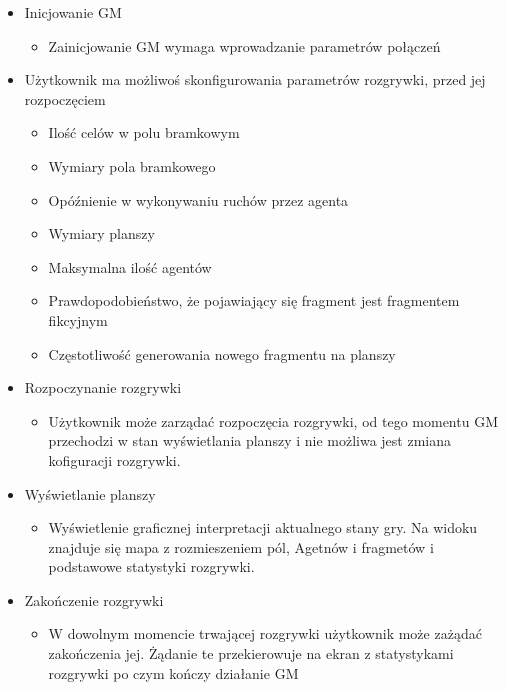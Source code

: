 \documentclass[../Dokumentacja.tex]{subfiles}
\begin{document}
\begin{itemize}
	\item Inicjowanie GM
	\begin{itemize}
		\item Zainicjowanie GM wymaga wprowadzanie parametrów połączeń
	\end{itemize}
	\item Użytkownik ma możliwoś skonfigurowania parametrów rozgrywki, przed jej rozpoczęciem
	\begin{itemize}
		\item Ilość celów w polu bramkowym
		\item Wymiary pola bramkowego
		\item Opóźnienie w wykonywaniu ruchów przez agenta
		\item Wymiary planszy
		\item Maksymalna ilość agentów
		\item Prawdopodobieństwo, że pojawiający się fragment jest fragmentem fikcyjnym
		\item Częstotliwość generowania nowego fragmentu na planszy
	\end{itemize}
	\item Rozpoczynanie rozgrywki
	\begin{itemize}
		\item Użytkownik może zarządać rozpoczęcia rozgrywki, od tego momentu GM przechodzi w stan wyświetlania planszy i nie możliwa jest zmiana kofiguracji rozgrywki.
	\end{itemize}
	\item Wyświetlanie planszy
	\begin{itemize}
		\item Wyświetlenie graficznej interpretacji aktualnego stany gry. Na widoku znajduje się mapa z rozmieszeniem pól, Agetnów i fragmetów i podstawowe statystyki rozgrywki.
	\end{itemize}
	\item Zakończenie rozgrywki
	\begin{itemize}
		\item W dowolnym momencie trwającej rozgrywki użytkownik może zażądać zakończenia jej. Żądanie te przekierowuje na ekran z statystykami rozgrywki po czym kończy działanie GM
	\end{itemize}
\end{itemize}
\end{document}
